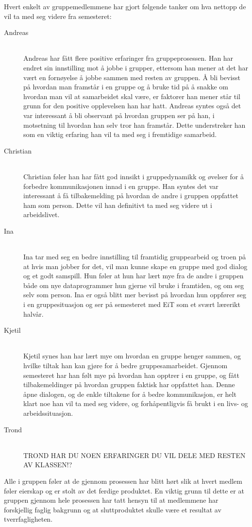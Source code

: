 Hvert enkelt av gruppemedlemmene har gjort følgende tanker om hva nettopp de vil ta med seg videre fra semesteret:
\begin{description}
\item[Andreas] \hfill \\
Andreas har fått flere positive erfaringer fra gruppeprosessen. Han har endret sin innstilling mot å jobbe i grupper, ettersom han mener at det har vært en fornøyelse å jobbe sammen med resten av gruppen. Å bli bevisst på hvordan man framstår i en gruppe og å bruke tid på å snakke om hvordan man vil at samarbeidet skal være, er faktorer han mener står til grunn for den positive opplevelsen han har hatt. Andreas syntes også det var interessant å bli observant på hvordan gruppen ser på han, i motsetning til hvordan han selv tror han framstår. Dette understreker han som en viktig erfaring han vil ta med seg i fremtidige samarbeid.

\item[Christian] \hfill \\
Christian føler han har fått god innsikt i gruppedynamikk og øvelser for å forbedre kommunikasjonen innad i en gruppe. Han syntes det var interessant å få tilbakemelding på hvordan de andre i gruppen oppfattet ham som person. Dette vil han definitivt ta med seg videre ut i arbeidslivet.  

\item[Ina] \hfill \\
Ina tar med seg en bedre innstilling til framtidig gruppearbeid og troen på at hvis man jobber for 
det, vil man kunne skape en gruppe med god dialog og et godt samspill. Hun føler at hun har lært mye fra de andre
i gruppen både om nye dataprogrammer hun gjerne vil bruke i framtiden, og om seg selv som person.
Ina er også blitt mer bevisst på hvordan hun oppfører seg i en gruppesituasjon og ser på semesteret med
EiT som et svært lærerikt halvår.

\item[Kjetil] \hfill \\
Kjetil synes han har lært mye om hvordan en gruppe henger sammen, og
hvilke tiltak han kan gjøre for å bedre gruppesamarbeidet. Gjennom
semesteret har han følt mye på hvordan han opptrer i en gruppe, og fått
tilbakemeldinger på hvordan gruppen faktisk har oppfattet han. Denne
åpne dialogen, og de enkle tiltakene for å bedre kommunikasjon, er helt
klart noe han vil ta med seg videre, og forhåpentligvis få brukt i en
livs- og arbeidssituasjon.

\item[Trond] \hfill \\
TROND HAR DU NOEN ERFARINGER DU VIL DELE MED RESTEN AV KLASSEN!?

\end{description}
Alle i gruppen føler at de gjennom prosessen har blitt hørt slik at hvert medlem føler eierskap og er stolt av det ferdige produktet. 
En viktig grunn til dette er at gruppen gjennom hele prosessen har tatt hensyn til at medlemmene har forskjellig faglig bakgrunn og 
at sluttproduktet skulle være et resultat av tverrfagligheten.


